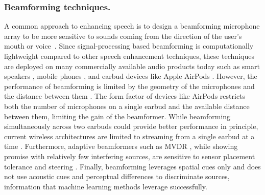 \documentclass [11pt, proquest] {uwthesis}[2020/02/24]
\begin{document}
\subsubsection{Beamforming techniques.} A common approach to enhancing speech is to design a beamforming microphone array to be more sensitive to sounds coming from the direction of the user's mouth \cite{van1988beamforming} or voice~\cite{dov-uist21}. Since signal-processing based beamforming is computationally lightweight compared to other speech enhancement techniques, these techniques are deployed on many commercially available audio products today such as smart speakers \cite{amazon}, mobile phones \cite{samsungglobalnewsroom_2014}, and earbud devices like Apple AirPods \cite{airpods}. However, the performance of beamforming is limited by the geometry of the microphones and the distance between them \cite{van1988beamforming, InvenSense}. The form factor of devices like AirPods restricts both the number of microphones on a single earbud and the available distance between them, limiting the gain of the beamformer. While beamforming simultaneously across two earbuds could provide better performance in principle, current wireless architectures are limited to streaming from a single earbud at a time \cite{bluetooth}. Furthermore, adaptive beamformers such as MVDR \cite{frost1972MVDR}, while showing promise with relatively few interfering sources,  are sensitive to sensor placement tolerance and steering \cite{zhang2017deep, brandstein2001microphone}. Finally, beamforming leverages spatial cues only and does not use acoustic cues and perceptual differences to discriminate sources, information that machine learning methods leverage successfully.






\end{document}
